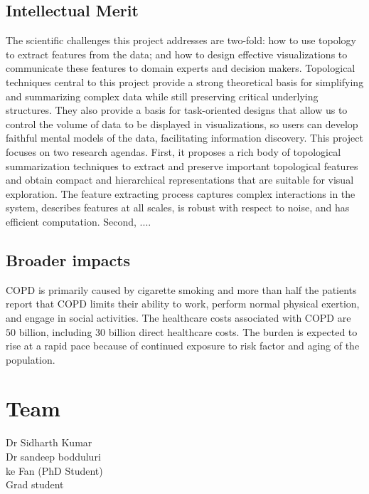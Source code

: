 \documentclass[11pt]{article}
\begin{document}
\subsection{Intellectual Merit}
The scientific challenges this project addresses are two-fold: how to use topology to extract features from the data; and how to design effective visualizations to communicate these features to domain experts and decision makers. Topological techniques central to this project provide a strong theoretical basis for simplifying and summarizing complex data while still preserving critical underlying structures. They also provide a basis for task-oriented designs that allow us to control the volume of data to be displayed in visualizations, so users can develop faithful mental models of the data, facilitating information discovery. This project focuses on two research agendas. First, it proposes a rich body of topological summarization techniques to extract and preserve important topological features and obtain compact and hierarchical representations that are suitable for visual exploration. The feature extracting process captures complex interactions in the system, describes features at all scales, is robust with respect to noise, and has efficient computation. Second, ....

\subsection{Broader impacts}
COPD is primarily caused by cigarette smoking and more than half the patients report that COPD limits their ability to work, perform normal physical exertion, and engage in social activities. 
The healthcare costs associated with COPD are $50$ billion, including $30$ billion direct healthcare costs. The burden is expected to rise at a rapid pace because of continued exposure to risk factor and aging of the population.

\clearpage


\section{Team}
Dr Sidharth Kumar \\
Dr sandeep bodduluri \\
ke Fan (PhD Student) \\
Grad student \\
\clearpage
\end{document}
